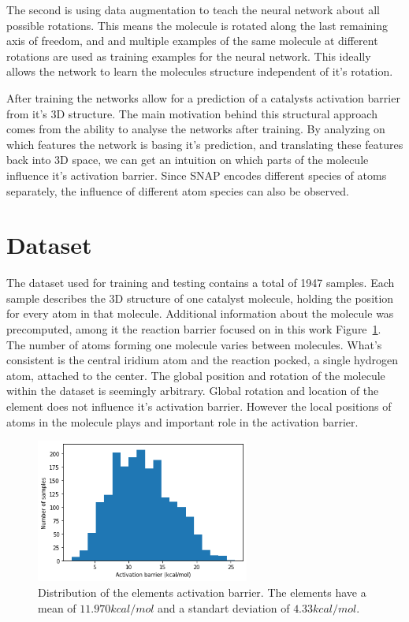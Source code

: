The second is using data augmentation to teach the neural network about all possible rotations.
This means the molecule is rotated along the last remaining axis of freedom, and and multiple examples of the same molecule at different rotations are used as training examples for the neural network.
This ideally allows the network to learn the molecules structure independent of it's rotation.

After training the networks allow for a prediction of a catalysts activation barrier from it's 3D structure.
The main motivation behind this structural approach  comes from the ability to analyse the networks after training.
By analyzing on which features the network is basing it's prediction, and translating these features back into 
3D space, we can get an intuition on which parts of the molecule influence it's activation barrier.
Since SNAP encodes different species of atoms separately, the influence of different atom species 
can also be observed.

\section{Dataset}

The dataset used for training and testing contains a total of 1947 samples.
Each sample describes the 3D structure of one catalyst molecule, 
holding the position for every atom in that molecule.
Additional information about the molecule was precomputed, among it the reaction barrier focused on in this work Figure~\ref{fig:barriers}.
The number of atoms forming one molecule varies between molecules.
What's consistent is the central iridium atom and the reaction pocked, a single hydrogen atom, attached to the center.
The global position and rotation of the molecule within the dataset is seemingly arbitrary.
Global rotation and location of the element does not influence it's activation barrier.
However the local positions of atoms in the molecule plays and important role in the activation barrier.

\begin{figure}
  \centering
  \includegraphics[width=7cm]{figures/introduction/barrier.png}
  \caption{Distribution of the elements activation barrier. The elements have a mean of $11.970 kcal/mol$ and a standart deviation of $4.33 kcal/mol$.}
  \label{fig:barriers}
\end{figure}

